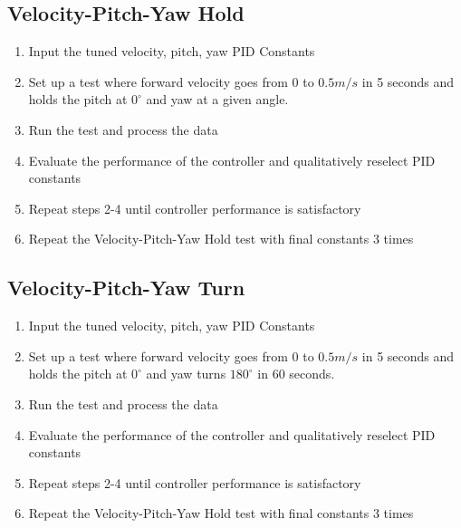 \documentclass{article}
\begin{document}
\subsection*{Velocity-Pitch-Yaw Hold}
\begin{enumerate}
\item Input the tuned velocity, pitch, yaw PID Constants
\item Set up a test where forward velocity goes from  0 to $0.5 m/s$ in 5 seconds and holds the pitch at $0^\circ$ and yaw at a given angle.
\item Run the test and process the data
\item Evaluate the performance of the controller and qualitatively reselect PID constants
\item Repeat steps 2-4 until controller performance is satisfactory
\item Repeat the Velocity-Pitch-Yaw Hold test with final constants 3 times
\end{enumerate}

\subsection*{Velocity-Pitch-Yaw Turn}
\begin{enumerate}
\item Input the tuned velocity, pitch, yaw PID Constants
\item Set up a test where forward velocity goes from  0 to $0.5 m/s$ in 5 seconds and holds the pitch at $0^\circ$ and yaw turns $180^\circ$ in 60 seconds.
\item Run the test and process the data
\item Evaluate the performance of the controller and qualitatively reselect PID constants
\item Repeat steps 2-4 until controller performance is satisfactory
\item Repeat the Velocity-Pitch-Yaw Hold test with final constants 3 times
\end{enumerate}
\end{document}
